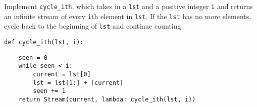 \begin{blocksection}
\question Implement \lstinline$cycle_ith$, which takes in a \lstinline$lst$ and a positive
integer \lstinline$i$ and returns an infinite stream of every \lstinline$i$th element in
\lstinline$lst$. If the \lstinline$lst$ has no more elements, cycle back to the beginning of
\lstinline$lst$ and continue counting.

\begin{lstlisting}
def cycle_ith(lst, i):
\end{lstlisting}

\begin{solution}[1.5in]
\begin{lstlisting}
    seen = 0
    while seen < i:
        current = lst[0]
        lst = lst[1:] + [current]
        seen += 1
    return Stream(current, lambda: cycle_ith(lst, i))
\end{lstlisting}
\end{solution}
\end{blocksection}
